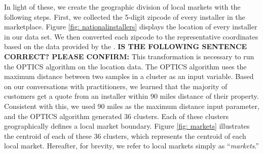 \documentclass[msom,blindrev]{informs3}
\begin{document}
	In light of these, we create the geographic division of local markets with the following steps. First, we collected the 5-digit zipcode of
	every installer in the marketplace. Figure \ref{fig: nationalinstallers} displays the location of every installer in our data set. We then converted each zipcode  to the representative coordinates based on the data provided by the \citet{us_census_bureau_2019}. \textbf{IS THE FOLLOWING SENTENCE CORRECT? PLEASE CONFIRM:} This transformation is necessary to run the OPTICS algorithm on the location data. The OPTICS algorithm uses the maximum distance between two samples in a cluster as an input variable. Based on our conversations with practitioners, we learned that the majority of customers get a quote from an installer within 90 miles distance of their property. Consistent with this, we used 90 miles as the maximum distance input parameter, and the OPTICS algorithm generated 36 clusters. Each of these clusters geographically defines a local market boundary. Figure \ref{fig: markets} illustrates the centroid of each of these 36 clusters, which represents the centroid of each local market. Hereafter, for brevity, we refer to local markets simply as ``\emph{markets}.''
	
	
	
	
	
\end{document}
